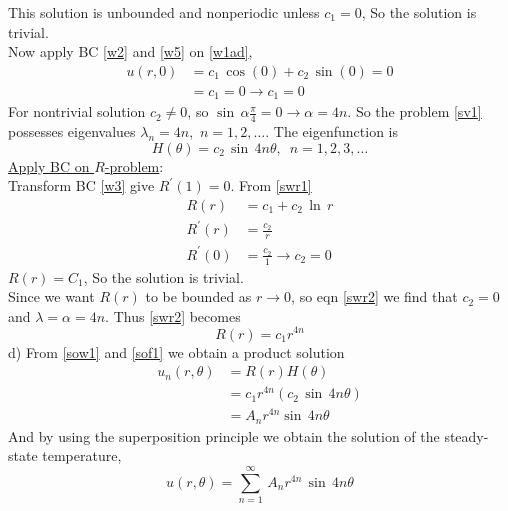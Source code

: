 This solution is unbounded and nonperiodic unless $c_1=0$, So the solution is trivial.\\
Now apply BC \eqref{w2} and \eqref{w5} on \eqref{w1ad},
\begin{align*}
u(r,0)&=c_1\,\cos(0)+c_2\,\sin(0)=0\\
&=c_1=0\to c_1=0
\end{align*}
For nontrivial solution $c_2\neq 0$, so $\sin\,\alpha\frac{\pi}{4}=0\to \alpha=4n$. So  the problem \eqref{sv1} possesses eigenvalues $\lambda_n=4n,\,\,n=1,2,\ldots$. The eigenfunction is
\begin{equation}
H(\theta)=c_2\,\sin\,4n\theta,\,\,\,n=1,2,3,\ldots\label{sow1}
\end{equation}
\underline{Apply BC on $R$-problem}:\\
Transform  BC \eqref{w3} %
give $R^{'}(1)=0$. From \eqref{swr1}
\begin{align*}
R(r)&=c_1+c_2\,\ln\, r\\
R^{'}(r)&=\frac{c_2}{r}\\
R^{'}(0)&=\frac{c_2}{1}\to c_2=0
\end{align*}
$R(r)=C_1$,
So the solution is trivial.\\
Since we want $R(r)$ to be bounded as $r\to 0$, so eqn \eqref{swr2} we find that $c_2=0$ and $\lambda=\alpha=4n$. Thus \eqref{swr2} becomes
\begin{equation}
R(r)=c_1r^{4n}\label{sof1}
\end{equation}
d) From \eqref{sow1} and \eqref{sof1} we obtain a product solution
\begin{align*}
u_n(r,\theta)&=R(r)H(\theta)\\
&=c_1r^{4n}(c_2\,\sin\,4n\theta)\\
&=A_nr^{4n}\sin\,4n\theta
\end{align*}
And by using the superposition principle we obtain the solution of the steady-state temperature,
\begin{equation}
u(r,\theta)=\sum_{n=1}^\infty\,A_nr^{4n}\,\sin\,4n\theta\label{sowl}
\end{equation}
